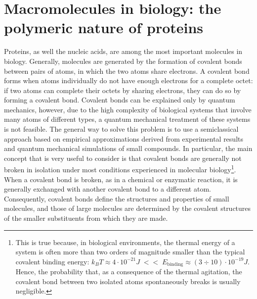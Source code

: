 \section{Macromolecules in biology: the polymeric nature of proteins}\label{sec:polym-prot}
Proteins, as well the nucleic acids, are among the most important molecules in biology. 
Generally, molecules are generated by the formation of covalent bonds between pairs of atoms, in which the two atoms share electrons. A covalent bond forms when atoms individually do not have enough electrons for a complete octet: if two atoms can complete their octets by sharing electrons, they can do so by forming a covalent bond. Covalent bonds can be explained only by quantum mechanics, however, due to the high complexity of biological systems that involve many atoms of different types, a quantum mechanical treatment of these systems is not feasible.
The general way to solve this problem is to use a semiclassical approach based on empirical approximations derived from experimental results and quantum mechanical simulations of small compounds. In particular, the main concept that is very useful to consider is that covalent bonds are generally not broken in isolation under most conditions experienced in molecular biology\footnote{This is true because, in biological environments, the thermal energy of a system is often more than two orders of magnitude smaller than the typical covalent binding energy: $k_B T \approx 4 \cdot 10^{-21} J \; << \; E_{\text{binding}} \approx (3 \div 10) \cdot 10^{-19} J$. Hence, the probability that, as a consequence of the thermal agitation, the covalent bond between two isolated atoms spontaneously breaks is usually negligible.}. When a covalent bond is broken, as in a chemical or enzymatic reaction, it is generally exchanged with another covalent bond to a different atom. Consequently, covalent bonds define the structures and properties of small molecules, and those of large molecules are determined by the covalent structures of the smaller substituents from which they are made.

